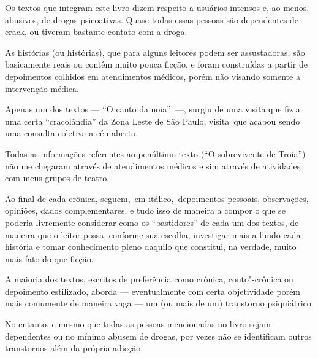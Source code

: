  

Os textos que integram este livro dizem respeito a usuários intensos e,
ao menos, abusivos, de drogas psicoativas. Quase todas essas pessoas são
dependentes de crack, ou tiveram bastante contato com a droga.

As histórias (ou histórias), que para alguns leitores podem ser
assustadoras, são basicamente reais ou contêm muito pouca ficção, e
foram construídas a partir de depoimentos colhidos em atendimentos
médicos, porém não visando somente a intervenção médica.

Apenas um dos textos --- ``O canto da noia''~\mbox{---,} surgiu de uma visita
que fiz a uma certa ``cracolândia'' da Zona Leste de São Paulo,
visita~que acabou sendo uma consulta coletiva a céu aberto.

Todas as informações referentes ao penúltimo texto (``O sobrevivente de
Troia'') não me chegaram através de atendimentos médicos e sim através
de atividades com meus grupos de teatro.

Ao final de cada crônica, seguem,~em itálico,~depoimentos pessoais,
observações, opiniões, dados complementares, e tudo isso de maneira a
compor o que se poderia livremente considerar como os ``bastidores'' de
cada um dos textos, de maneira que o leitor possa, conforme sua escolha,
investigar mais a fundo cada história e tomar conhecimento pleno daquilo
que constitui, na verdade, muito mais fato do que ficção.

A maioria dos textos, escritos de preferência como crônica,
conto"-crônica ou depoimento estilizado, aborda --- eventualmente com
certa objetividade porém mais comumente de maneira vaga --- um (ou mais
de um) transtorno psiquiátrico.

No entanto, e mesmo que todas as pessoas mencionadas no livro sejam
dependentes ou no mínimo abusem de drogas, por vezes não se identificam
outros transtornos além da própria adicção.

 
